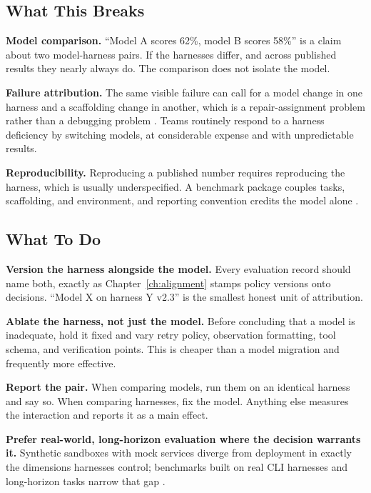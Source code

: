 \subsection{What This Breaks}

\textbf{Model comparison.} ``Model A scores 62\%, model B scores 58\%'' is a claim
about two model-harness pairs. If the harnesses differ, and across published
results they nearly always do. The comparison does not isolate the model.

\textbf{Failure attribution.} The same visible failure can call for a model change
in one harness and a scaffolding change in another, which is a repair-assignment
problem rather than a debugging problem \cite{modelharness2026}. Teams routinely
respond to a harness deficiency by switching models, at considerable expense and
with unpredictable results.

\textbf{Reproducibility.} Reproducing a published number requires reproducing the
harness, which is usually underspecified. A benchmark package couples tasks,
scaffolding, and environment, and reporting convention credits the model alone
\cite{uniace2026}.

\subsection{What To Do}

\textbf{Version the harness alongside the model.} Every evaluation record should
name both, exactly as Chapter~\ref{ch:alignment} stamps policy versions onto
decisions. ``Model X on harness Y v2.3'' is the smallest honest unit of
attribution.

\textbf{Ablate the harness, not just the model.} Before concluding that a model is
inadequate, hold it fixed and vary retry policy, observation formatting, tool
schema, and verification points. This is cheaper than a model migration and
frequently more effective.

\textbf{Report the pair.} When comparing models, run them on an identical harness
and say so. When comparing harnesses, fix the model. Anything else measures the
interaction and reports it as a main effect.

\textbf{Prefer real-world, long-horizon evaluation where the decision warrants it.}
Synthetic sandboxes with mock services diverge from deployment in exactly the
dimensions harnesses control; benchmarks built on real CLI harnesses and
long-horizon tasks narrow that gap \cite{wildclaw2026, clawswe2026}.


